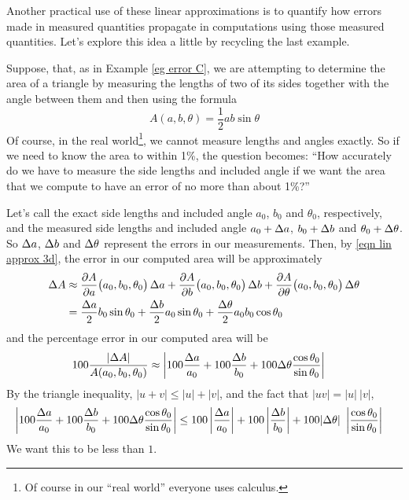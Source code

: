Another practical use of these linear approximations is to quantify
how errors made in measured quantities propagate in computations
using those measured quantities. Let's explore this idea a little
by recycling the last example.

\begin{eg}\label{eg error D}
Suppose, that, as in Example \ref{eg error C}, we are attempting
to determine the area of a triangle by measuring the lengths of two of its 
sides together with the angle between them and then using the formula
\begin{equation*}
A(a,b,\theta) = \frac{1}{2} ab\sin\theta
\end{equation*}
Of course, in the real world\footnote{Of course in our ``real world'' everyone uses calculus.}, we cannot measure lengths and angles exactly. So if we need
to know the area to within 1\%,  the question becomes: ``How accurately 
do we have to measure the side lengths
and included angle if we want the area that we compute to have 
an error of no more than about 1\%?''

Let's call the exact side lengths and included angle $a_0$, $b_0$ and
$\theta_0$, respectively, and the measured side lengths and included 
angle $a_0+\Delta a$, $b_0+\Delta b$ and $\theta_0+\Delta\theta$.
So $\Delta a$, $\Delta b$ and $\Delta\theta$ represent the errors in our 
measurements. Then, by \eqref{eqn lin approx 3d}, the
error in our computed area will be approximately
\begin{align*}
\De A &\approx \pdiff{A}{a}\big(a_0,b_0,\theta_0\big)\,\De a
    + \pdiff{A}{b}\big(a_0,b_0,\theta_0\big)\,\De b
    + \pdiff{A}{\theta}\big(a_0,b_0,\theta_0\big)\,\De\theta \\
&=\frac{\De a}{2} b_0\sin\theta_0
   +\frac{\De b}{2} a_0\sin\theta_0
   +\frac{\De \theta}{2} a_0b_0\cos\theta_0
\end{align*}
and the percentage error in our computed area will be
\begin{align*}
100\frac{|\Delta A|}{A(a_0,b_0,\theta_0)}
&\approx \left|  100\frac{\Delta a}{a_0} + 100\frac{\Delta b}{b_0} 
                  +100\Delta\theta\frac{\cos\theta_0}{\sin\theta_0} \right| 
\end{align*}
By the triangle inequality, $|u+v|\le |u|+|v|$, and the fact that 
$|uv|=|u|\ |v|$,
\begin{align*}
\left|  100\frac{\Delta a}{a_0} + 100\frac{\Delta b}{b_0} 
                  +100\Delta\theta\frac{\cos\theta_0}{\sin\theta_0} \right| 
&\le 100\left|\frac{\Delta a}{a_0}\right| + 100\left|\frac{\Delta b}{b_0} \right|
             +100|\Delta\theta|\ \left|\frac{\cos\theta_0}{\sin\theta_0} \right|
\end{align*}
We want this to be less than $1$.



\end{eg}
